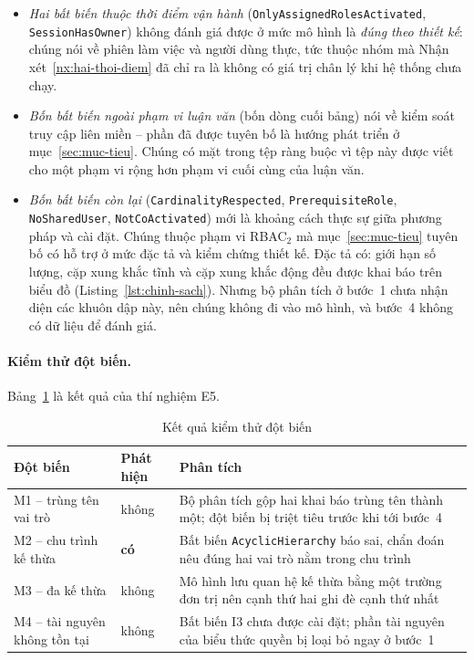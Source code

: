 \begin{itemize}[leftmargin=1.6em,itemsep=3pt]
  \item \emph{Hai bất biến thuộc thời điểm vận hành} (\texttt{OnlyAssignedRolesActivated}, \texttt{SessionHasOwner}) không đánh giá được ở mức mô hình là \emph{đúng theo thiết kế}: chúng nói về phiên làm việc và người dùng thực, tức thuộc nhóm mà Nhận xét~\ref{nx:hai-thoi-diem} đã chỉ ra là không có giá trị chân lý khi hệ thống chưa chạy.
  \item \emph{Bốn bất biến ngoài phạm vi luận văn} (bốn dòng cuối bảng) nói về kiểm soát truy cập liên miền -- phần đã được tuyên bố là hướng phát triển ở mục~\ref{sec:muc-tieu}. Chúng có mặt trong tệp ràng buộc vì tệp này được viết cho một phạm vi rộng hơn phạm vi cuối cùng của luận văn.
  \item \emph{Bốn bất biến còn lại} (\texttt{CardinalityRespected}, \texttt{PrerequisiteRole}, \texttt{NoSharedUser}, \texttt{NotCoActivated}) mới là khoảng cách thực sự giữa phương pháp và cài đặt. Chúng thuộc phạm vi RBAC$_2$ mà mục~\ref{sec:muc-tieu} tuyên bố có hỗ trợ ở mức đặc tả và kiểm chứng thiết kế. Đặc tả có: giới hạn số lượng, cặp xung khắc tĩnh và cặp xung khắc động đều được khai báo trên biểu đồ (Listing~\ref{lst:chinh-sach}). Nhưng bộ phân tích ở bước~1 chưa nhận diện các khuôn dập này, nên chúng không đi vào mô hình, và bước~4 không có dữ liệu để đánh giá.
\end{itemize}

\paragraph{Kiểm thử đột biến.}
Bảng~\ref{tab:ket-qua-dot-bien} là kết quả của thí nghiệm E5.

\begin{table}[htbp]
\centering
\caption{Kết quả kiểm thử đột biến}
\label{tab:ket-qua-dot-bien}
\small
\begin{tabularx}{\textwidth}{@{}llX@{}}
\toprule
\textbf{Đột biến} & \textbf{Phát hiện} & \textbf{Phân tích} \\
\midrule
M1 -- trùng tên vai trò & không & Bộ phân tích gộp hai khai báo trùng tên thành một; đột biến bị triệt tiêu trước khi tới bước~4 \\
M2 -- chu trình kế thừa & \textbf{có} & Bất biến \texttt{AcyclicHierarchy} báo sai, chẩn đoán nêu đúng hai vai trò nằm trong chu trình \\
M3 -- đa kế thừa & không & Mô hình lưu quan hệ kế thừa bằng một trường đơn trị nên cạnh thứ hai ghi đè cạnh thứ nhất \\
M4 -- tài nguyên không tồn tại & không & Bất biến I3 chưa được cài đặt; phần tài nguyên của biểu thức quyền bị loại bỏ ngay ở bước~1 \\
\bottomrule
\end{tabularx}
\end{table}

